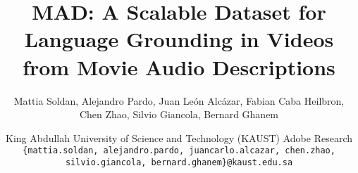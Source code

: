 \documentclass[10pt,twocolumn,letterpaper]{article}
\begin{document}
\title{MAD: A Scalable Dataset for Language Grounding in Videos\\from Movie Audio Descriptions }

{\author{
Mattia Soldan, 
\quad Alejandro Pardo,
\quad Juan León Alcázar,
\quad Fabian Caba Heilbron, \\
\quad Chen Zhao,
\quad Silvio Giancola, 
\quad Bernard Ghanem
\and
King Abdullah University of Science and Technology (KAUST) \quad Adobe Research\\
{\tt\small \{mattia.soldan, alejandro.pardo, juancarlo.alcazar, chen.zhao,}\\ 
{\tt\small silvio.giancola, bernard.ghanem\}@kaust.edu.sa}
}}

\maketitle
\end{document}
